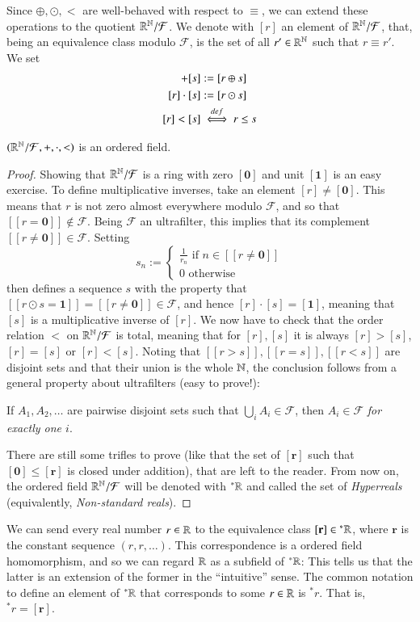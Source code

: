 \documentclass[adraft, copyright,creativecommons,sharealike,noncommercial]{Preambles/eptcs}
\newcommand{\nstar}{{^*}}
\begin{document}
Since $\oplus, \odot, <$ are well-behaved with respect to $\equiv$, we can extend these operations to the quotient $\mathbb{R}^{\mathbb{N}}/ \mathcal{F}$. We denote with $[r]$ an element of $\mathbb{R}^{\mathbb{N}}/ \mathcal{F}$, that, being an equivalence class modulo $\mathcal{F}$, is the set of all $r' \in \mathbb{R}^{\mathbb{N}}$ such that $r \equiv r'$. We set
\begin{align*}
	[r] + [s] &:= [r \oplus s]\\
	[r] \cdot [s] &:= [r \odot s]\\
	[r] < [s] &\iffdef r \leq s	
\end{align*}
\begin{theorem}
	$(\mathbb{R}^{\mathbb{N}}/ \mathcal{F}, +, \cdot, <)$ is an ordered field. 
\end{theorem} 
\begin{proof}
	Showing that $\mathbb{R}^{\mathbb{N}}/ \mathcal{F}$ is a ring with zero $[\mathbf{0}]$ and unit $[\mathbf{1}]$ is an easy exercise. To define multiplicative inverses, take an element $[r] \neq [\mathbf{0}]$. This means that $r$ is not zero almost everywhere modulo $\mathcal{F}$, and so that $[[r = \mathbf{0}]] \notin \mathcal{F}$. Being $\mathcal{F}$ an ultrafilter, this implies that its complement $[[r \neq \mathbf{0}]] \in \mathcal{F}$.
	Setting
	\[
	s_n := \begin{cases}
	\frac{1}{r_n} \text{ if } n \in [[r \neq \mathbf{0}]]\\
	0 \text{ otherwise}
	\end{cases}
	\]
	then defines a sequence $s$ with the property that $[[r \odot s = \mathbf{1}]] = [[r \neq \mathbf{0}]] \in \mathcal{F}$, and hence $[r] \cdot [s] = [\mathbf{1}]$, meaning that $[s]$ is a multiplicative inverse of $[r]$.
	We now have to check that the order relation $<$ on $\mathbb{R}^{\mathbb{N}}/ \mathcal{F}$ is total, meaning that for $[r],[s]$ it is always $[r]>[s]$, $[r]=[s]$ or $[r]<[s]$.
	Noting that $[[r > s]], [[r=s]], [[r < s]]$ are disjoint sets and that their union is the whole $\mathbb{N}$, the conclusion follows from a general property about ultrafilters (easy to prove!):
	\begin{center}
		If $A_1, A_2, \dots$ are pairwise disjoint sets such that $\bigcup_i A_i \in \mathcal{F}$, then $A_i \in \mathcal{F}$ \emph{for exactly one $i$}.
	\end{center}
	There are still some trifles to prove (like that the set of $[\mathbf{r}]$ such that $[\mathbf{0}] \leq [\mathbf{r}]$ is closed under addition), that are left to the reader. From now on, the ordered field $\mathbb{R}^{\mathbb{N}}/ \mathcal{F}$ will be denoted with $\nstar \reals$ and called the set of \emph{Hyperreals} (equivalently, \emph{Non-standard reals}). 
\end{proof}	
%
We can send every real number $r \in \mathbb{R}$ to the equivalence class $[\mathbf{r}] \in  {\nstar \reals}$, where $\mathbf{r}$ is the constant sequence $(r,r, \dots)$. This correspondence is a ordered field homomorphism, and so we can regard $\mathbb{R}$ as a subfield of $\nstar \reals$: This tells us that the latter is an extension of the former in the ``intuitive'' sense. The common notation to define an element of $\nstar \reals$ that corresponds to some $r \in \mathbb{R}$ is $\nstar r$. That is, $\nstar r = [\mathbf{r}]$.
\end{document}
